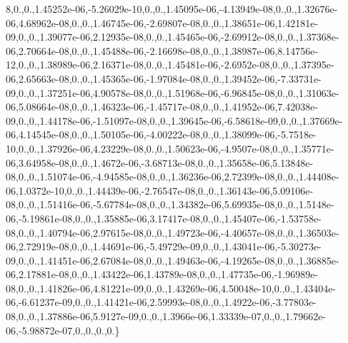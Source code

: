 \begin{DoxyCompactItemize}
8,0.,0.,1.\-45252e-\/06,-\/5.\-26029e-\/10,0.,0.,1.\-45095e-\/06,-\/4.\-13949e-\/08,0.,0.,1.\-32676e-\/06,4.\-68962e-\/08,0.,0.,1.\-46745e-\/06,-\/2.\-69807e-\/08,0.,0.,1.\-38651e-\/06,1.\-42181e-\/09,0.,0.,1.\-39077e-\/06,2.\-12935e-\/08,0.,0.,1.\-45465e-\/06,-\/2.\-69912e-\/08,0.,0.,1.\-37368e-\/06,2.\-70664e-\/08,0.,0.,1.\-45488e-\/06,-\/2.\-16698e-\/08,0.,0.,1.\-38987e-\/06,8.\-14756e-\/12,0.,0.,1.\-38989e-\/06,2.\-16371e-\/08,0.,0.,1.\-45481e-\/06,-\/2.\-6952e-\/08,0.,0.,1.\-37395e-\/06,2.\-65663e-\/08,0.,0.,1.\-45365e-\/06,-\/1.\-97084e-\/08,0.,0.,1.\-39452e-\/06,-\/7.\-33731e-\/09,0.,0.,1.\-37251e-\/06,4.\-90578e-\/08,0.,0.,1.\-51968e-\/06,-\/6.\-96845e-\/08,0.,0.,1.\-31063e-\/06,5.\-08664e-\/08,0.,0.,1.\-46323e-\/06,-\/1.\-45717e-\/08,0.,0.,1.\-41952e-\/06,7.\-42038e-\/09,0.,0.,1.\-44178e-\/06,-\/1.\-51097e-\/08,0.,0.,1.\-39645e-\/06,-\/6.\-58618e-\/09,0.,0.,1.\-37669e-\/06,4.\-14545e-\/08,0.,0.,1.\-50105e-\/06,-\/4.\-00222e-\/08,0.,0.,1.\-38099e-\/06,-\/5.\-7518e-\/10,0.,0.,1.\-37926e-\/06,4.\-23229e-\/08,0.,0.,1.\-50623e-\/06,-\/4.\-9507e-\/08,0.,0.,1.\-35771e-\/06,3.\-64958e-\/08,0.,0.,1.\-4672e-\/06,-\/3.\-68713e-\/08,0.,0.,1.\-35658e-\/06,5.\-13848e-\/08,0.,0.,1.\-51074e-\/06,-\/4.\-94585e-\/08,0.,0.,1.\-36236e-\/06,2.\-72399e-\/08,0.,0.,1.\-44408e-\/06,1.\-0372e-\/10,0.,0.,1.\-44439e-\/06,-\/2.\-76547e-\/08,0.,0.,1.\-36143e-\/06,5.\-09106e-\/08,0.,0.,1.\-51416e-\/06,-\/5.\-67784e-\/08,0.,0.,1.\-34382e-\/06,5.\-69935e-\/08,0.,0.,1.\-5148e-\/06,-\/5.\-19861e-\/08,0.,0.,1.\-35885e-\/06,3.\-17417e-\/08,0.,0.,1.\-45407e-\/06,-\/1.\-53758e-\/08,0.,0.,1.\-40794e-\/06,2.\-97615e-\/08,0.,0.,1.\-49723e-\/06,-\/4.\-40657e-\/08,0.,0.,1.\-36503e-\/06,2.\-72919e-\/08,0.,0.,1.\-44691e-\/06,-\/5.\-49729e-\/09,0.,0.,1.\-43041e-\/06,-\/5.\-30273e-\/09,0.,0.,1.\-41451e-\/06,2.\-67084e-\/08,0.,0.,1.\-49463e-\/06,-\/4.\-19265e-\/08,0.,0.,1.\-36885e-\/06,2.\-17881e-\/08,0.,0.,1.\-43422e-\/06,1.\-43789e-\/08,0.,0.,1.\-47735e-\/06,-\/1.\-96989e-\/08,0.,0.,1.\-41826e-\/06,4.\-81221e-\/09,0.,0.,1.\-43269e-\/06,4.\-50048e-\/10,0.,0.,1.\-43404e-\/06,-\/6.\-61237e-\/09,0.,0.,1.\-41421e-\/06,2.\-59993e-\/08,0.,0.,1.\-4922e-\/06,-\/3.\-77803e-\/08,0.,0.,1.\-37886e-\/06,5.\-9127e-\/09,0.,0.,1.\-3966e-\/06,1.\-33339e-\/07,0.,0.,1.\-79662e-\/06,-\/5.\-98872e-\/07,0.,0.,0.,0.\}

\end{DoxyCompactItemize}
